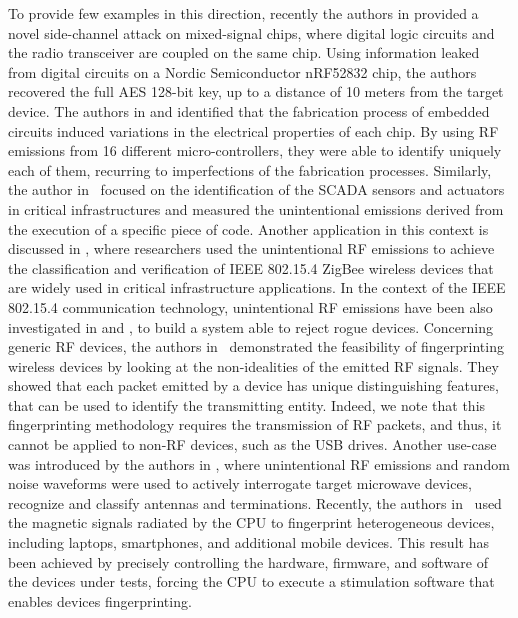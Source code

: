 \documentclass[acmsmall, authorversion]{acmart}
\begin{document}
To provide few examples in this direction, recently the authors in \cite{camurati2018} provided a novel side-channel attack on mixed-signal chips, where digital logic circuits and the radio transceiver are coupled on the same chip. Using information leaked from digital circuits on a Nordic Semiconductor nRF52832 chip, the authors recovered the full AES 128-bit key, up to a distance of 10 meters from the target device. The authors in \cite{Cobb2012_tifs} and \cite{cobb2010} identified that the fabrication process of embedded circuits induced variations in the electrical properties of each chip. By using RF emissions from 16 different micro-controllers, they were able to identify uniquely each of them, recurring to imperfections of the fabrication processes. Similarly, the author in~\cite{wright2014} focused on the identification of the SCADA sensors and actuators in critical infrastructures and measured the unintentional emissions derived from the execution of a specific piece of code. Another application in this context is discussed in \cite{bihl2016}, where researchers used the unintentional RF emissions to achieve the classification and verification of IEEE 802.15.4 ZigBee wireless devices that are widely used in critical infrastructure applications. In the context of the IEEE 802.15.4 communication technology, unintentional RF emissions have been also investigated in \cite{Dubendorfer2012} and \cite{ramsey2012}, to build a system able to reject rogue devices. Concerning generic RF devices, the authors in~\cite{Suski2008} demonstrated the feasibility of fingerprinting wireless devices by looking at the non-idealities of the emitted RF signals. They showed that each packet emitted by a device has unique distinguishing features, that can be used to identify the transmitting entity. Indeed, we note that this fingerprinting methodology requires the transmission of RF packets, and thus, it cannot be applied to non-RF devices, such as the USB drives. Another use-case was introduced by the authors in \cite{lukacs2015}, where unintentional RF emissions and random noise waveforms were used to actively interrogate target microwave devices, recognize and classify antennas and terminations. Recently, the authors in~\cite{Cheng2019_ccs} used the magnetic signals radiated by the CPU to fingerprint heterogeneous devices, including laptops, smartphones, and additional mobile devices. This result has been achieved by precisely controlling the hardware, firmware, and software of the devices under tests, forcing the CPU to execute a stimulation software that enables devices fingerprinting.
\end{document}

